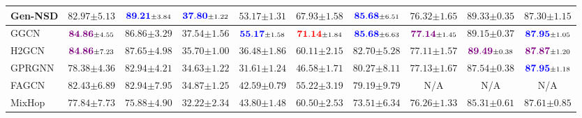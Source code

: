 \documentclass{article}
\newcommand{\first}[1]{\mathbf{\textcolor{red}{#1}}}
\newcommand{\second}[1]{\mathbf{\textcolor{blue}{#1}}}
\newcommand{\third}[1]{\mathbf{\textcolor{violet}{#1}}}
\begin{document}
\begin{table*}[t]
{\begin{tabular}{l ccccccccc}
         \textbf{Gen-NSD} &
         $82.97 {\scriptstyle \pm 5.13}$ &
         $\second{89.21} {\scriptstyle \pm 3.84}$ &
         $\second{37.80} {\scriptstyle \pm 1.22}$ & 
         $53.17 {\scriptstyle \pm 1.31}$ & 
         $67.93 {\scriptstyle \pm 1.58}$ &
         $\second{85.68} {\scriptstyle \pm 6.51}$ & 
         $76.32 {\scriptstyle \pm 1.65}$ &
         $89.33 {\scriptstyle \pm 0.35}$ &
         $87.30 {\scriptstyle \pm 1.15}$ \\ \midrule

         GGCN &
         $\third{84.86} {\scriptstyle \pm 4.55}$ &
         $86.86 {\scriptstyle \pm 3.29}$ &
         $37.54 {\scriptstyle \pm 1.56}$ &
         $\second{55.17} {\scriptstyle \pm 1.58}$ & 
         $\first{71.14} {\scriptstyle \pm 1.84}$ &
         $\second{85.68} {\scriptstyle \pm 6.63}$ &
         $\third{77.14} {\scriptstyle \pm 1.45}$ &
         $89.15 {\scriptstyle \pm 0.37}$ &
         $\second{87.95} {\scriptstyle \pm 1.05}$ \\
         
         H2GCN &
         $\third{84.86} {\scriptstyle \pm 7.23}$ &
         $87.65 {\scriptstyle \pm 4.98}$ &
         $35.70 {\scriptstyle \pm 1.00}$ &
         $36.48 {\scriptstyle \pm 1.86}$ & 
         $60.11 {\scriptstyle \pm 2.15}$ &
         $82.70 {\scriptstyle \pm 5.28}$ &
         $77.11 {\scriptstyle \pm 1.57}$ &
         $\third{89.49} {\scriptstyle \pm 0.38}$ &
         $\third{87.87} {\scriptstyle \pm 1.20}$ \\

         GPRGNN &
         $78.38 {\scriptstyle \pm 4.36}$ &
         $82.94 {\scriptstyle \pm 4.21}$ &
         $34.63 {\scriptstyle \pm 1.22}$ & 
         $31.61 {\scriptstyle \pm 1.24}$ &
         $46.58 {\scriptstyle \pm 1.71}$ &
         $80.27 {\scriptstyle \pm 8.11}$ &
         $77.13 {\scriptstyle \pm 1.67}$ &
         $87.54 {\scriptstyle \pm 0.38}$ &
         $\second{87.95} {\scriptstyle \pm 1.18}$ \\ 
         
         FAGCN &
         $82.43 {\scriptstyle \pm 6.89}$ &
         $82.94 {\scriptstyle \pm 7.95}$ &
         $34.87 {\scriptstyle \pm 1.25}$ &
         $42.59 {\scriptstyle \pm 0.79}$ &
         $55.22 {\scriptstyle \pm 3.19}$ & 
         $79.19 {\scriptstyle \pm 9.79}$ &
         N/A & 
         N/A & 
         N/A \\
         
         MixHop &
         $77.84 {\scriptstyle \pm 7.73}$ &
         $75.88 {\scriptstyle \pm 4.90}$ &
         $32.22 {\scriptstyle \pm 2.34}$ & 
         $43.80 {\scriptstyle \pm 1.48}$ &
         $60.50 {\scriptstyle \pm 2.53}$ &
         $73.51 {\scriptstyle \pm 6.34}$ &
         $76.26 {\scriptstyle \pm 1.33}$ &
         $85.31 {\scriptstyle \pm 0.61}$ &
         $87.61 {\scriptstyle \pm 0.85}$ \\


\end{tabular}}
\end{table*}
\end{document}
